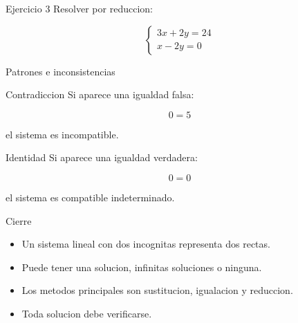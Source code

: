 \documentclass[aspectratio=169]{beamer}
\begin{document}
	\begin{frame}{Ejercicio 3}
		Resolver por reduccion:
		
		\[
		\begin{cases}
			3x+2y=24\\
			x-2y=0
		\end{cases}
		\]
	\end{frame}
	
	\begin{frame}{Patrones e inconsistencias}
		\begin{block}{Contradiccion}
			Si aparece una igualdad falsa:
			
			\[
			0=5
			\]
			
			el sistema es incompatible.
		\end{block}
		
		\begin{block}{Identidad}
			Si aparece una igualdad verdadera:
			
			\[
			0=0
			\]
			
			el sistema es compatible indeterminado.
		\end{block}
	\end{frame}
	
	\begin{frame}{Cierre}
		\begin{itemize}
			\item Un sistema lineal con dos incognitas representa dos rectas.
			\item Puede tener una solucion, infinitas soluciones o ninguna.
			\item Los metodos principales son sustitucion, igualacion y reduccion.
			\item Toda solucion debe verificarse.
		\end{itemize}
	\end{frame}
	
\end{document}

